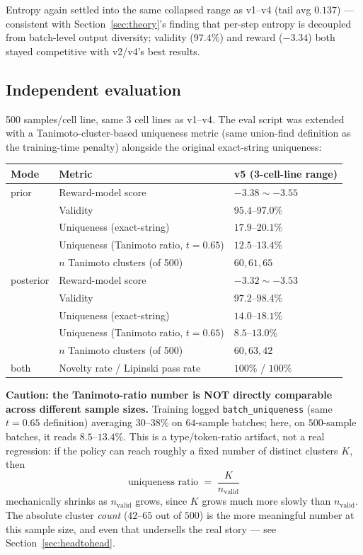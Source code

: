 \documentclass[11pt]{article}
\newcommand{\code}[1]{\texttt{#1}}
\begin{document}
Entropy again settled into the same collapsed range as v1--v4 (tail avg $0.137$) --- consistent with Section~\ref{sec:theory}'s finding that per-step entropy is decoupled from batch-level output diversity; validity ($97.4\%$) and reward ($-3.34$) both stayed competitive with v2/v4's best results.

\subsection{Independent evaluation}
\label{sec:v5eval}

500 samples/cell line, same 3 cell lines as v1--v4. The eval script was extended with a Tanimoto-cluster-based uniqueness metric (same union-find definition as the training-time penalty) alongside the original exact-string uniqueness:

\begin{center}
\begin{tabular}{@{}l l l@{}}
\toprule
\textbf{Mode} & \textbf{Metric} & \textbf{v5 (3-cell-line range)} \\
\midrule
prior & Reward-model score & $-3.38 \sim -3.55$ \\
      & Validity & $95.4$--$97.0\%$ \\
      & Uniqueness (exact-string) & $17.9$--$20.1\%$ \\
      & Uniqueness (Tanimoto ratio, $t=0.65$) & $12.5$--$13.4\%$ \\
      & $n$ Tanimoto clusters (of 500) & $60, 61, 65$ \\
posterior & Reward-model score & $-3.32 \sim -3.53$ \\
      & Validity & $97.2$--$98.4\%$ \\
      & Uniqueness (exact-string) & $14.0$--$18.1\%$ \\
      & Uniqueness (Tanimoto ratio, $t=0.65$) & $8.5$--$13.0\%$ \\
      & $n$ Tanimoto clusters (of 500) & $60, 63, 42$ \\
both  & Novelty rate / Lipinski pass rate & $100\%$ / $100\%$ \\
\bottomrule
\end{tabular}
\end{center}

\textbf{Caution: the Tanimoto-ratio number is NOT directly comparable across different sample sizes.} Training logged \code{batch\_uniqueness} (same $t=0.65$ definition) averaging $30$--$38\%$ on $64$-sample batches; here, on $500$-sample batches, it reads $8.5$--$13.4\%$. This is a type/token-ratio artifact, not a real regression: if the policy can reach roughly a fixed number of distinct clusters $K$, then
\[
  \text{uniqueness ratio} \;=\; \frac{K}{n_{\text{valid}}}
\]
mechanically shrinks as $n_{\text{valid}}$ grows, since $K$ grows much more slowly than $n_{\text{valid}}$. The absolute cluster \emph{count} ($42$--$65$ out of $500$) is the more meaningful number at this sample size, and even that undersells the real story --- see Section~\ref{sec:headtohead}.
\end{document}
